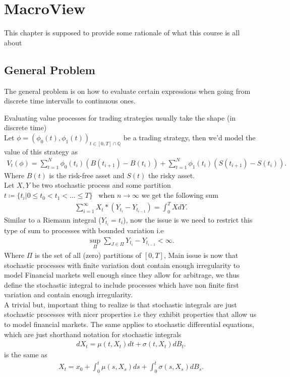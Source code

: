\chapter{MacroView}
This chapter is supposed to provide some rationale of what this course is all about
\section{General Problem}
The general problem is on how to evaluate certain expressions when going from discrete time intervalls
to continuous ones.
\begin{example}
	Evaluating value processes for trading strategies usually take the shape (in discrete time) \\[1ex]
	Let $\phi  = (\phi_{0}(t),\phi_1(t))_{t \in [0,T] \cap \mathbb{Q}}$ be a trading strategy, then we'd model the value of this strategy as
	\begin{align*}
    V_t(\phi ) = \sum_{t=1}^{N} \phi_0(t_i)(B(t_{i+1}) - B(t_{i})) +  \sum_{t=1}^{N} \phi_1(t_i)(S(t_{i+1}) - S(t_{i}))
	.\end{align*}
  Where $B(t)$ is the risk-free asset and $S(t)$ the risky asset. \\[1ex]
  Let $X,Y$ be two stochastic process and some partition $t \coloneqq  \{t_i | 0\le t_0<t_{1}<\ldots \le T\}  $ \ when $n \to \infty$ we get the following sum
  \begin{align*}
    \sum_{i=1}^{\infty}  X_t*(Y_{t_i} - Y_{t_{i-1}}) = \int_0^{T}  X dY
  .\end{align*}
  Similar to a Riemann integral ($Y_{t_i} = t_i$), now the issue is we need to restrict this type of sum to processes with bounded variation i.e 
  \begin{align*}
    \sup_{\Pi }  \sum_{J \in  \Pi} Y_{t_{i}} - Y_{t_{i-1}}  < \infty
  .\end{align*}
  Where $\Pi $ is the set of all (zero) partitions of $[0,T]$, Main issue is now that stochastic processes with finite variation dont contain enough irregularity to model
  Financial markets well enough since they allow for arbitrage, we thus define the stochastic integral to include processes which have non finite first variation and contain
  enough irregularity. \\[1ex]
  A trivial but, important thing to realize is that stochastic integrals are just stochastic processes with nicer properties i.e
  they exhibit properties that allow us to model financial markets. The same applies to stochastic differential equations, which are just shorthand notation for stochastic integrals 
  \begin{align*}
   dX_t = \mu(t,X_t)dt + \sigma(t,X_t)dB_t 
  .\end{align*}
  is the same as 
  \begin{align*}
    X_t = x_{0} + \int_0^{t} \mu(s,X_s) ds + \int_0^{t} \sigma(s,X_s) dB_s 
  .\end{align*}
\end{example}
